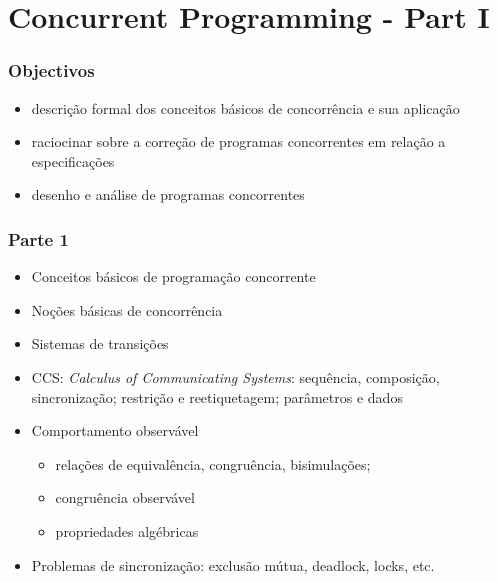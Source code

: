 \documentclass[aspectratio=169]{beamer}
\begin{document}

\section{Concurrent Programming - Part I}

\begin{frame}
\frametitle{Objectivos}
\begin{itemize}
  \item descrição formal dos conceitos básicos de concorrência e sua aplicação
\item raciocinar sobre a  correção de programas concorrentes  em relação a especificações
\item desenho e análise de programas concorrentes
\end{itemize} 
\end{frame}

\begin{frame}
\frametitle{Parte 1}
\begin{itemize}
\item Conceitos básicos de programação concorrente
\item Noções básicas de concorrência
\item Sistemas de transições
\item CCS: \emph{Calculus of Communicating Systems}:
sequência, composição, sincronização;
restrição e reetiquetagem;
parâmetros e dados
\item Comportamento observável
\begin{itemize}
\item relações de equivalência, congruência, bisimulações; 
\item congruência observável
\item propriedades algébricas
\end{itemize}
\item Problemas de sincronização: exclusão mútua, deadlock, locks, etc.
\end{itemize}
\end{frame}
\end{document}
